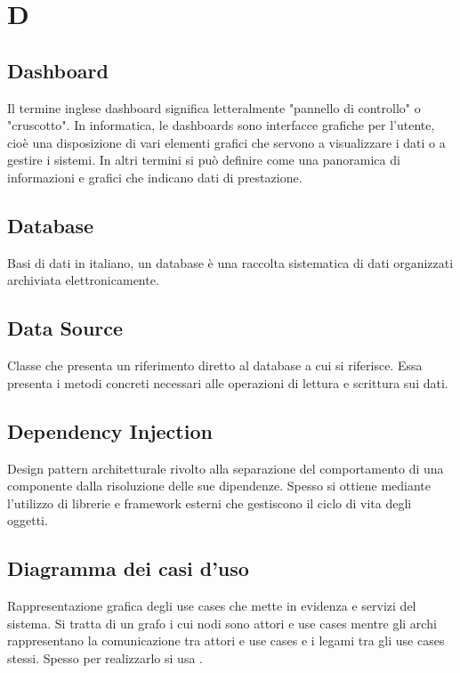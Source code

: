 \chapter{D}


\section{Dashboard}
Il termine inglese dashboard significa letteralmente "pannello di controllo" o "cruscotto". In informatica, le dashboards sono interfacce grafiche per l'utente, cioè una disposizione di vari elementi grafici che servono a visualizzare i dati o a gestire i sistemi. In altri termini si può definire come una panoramica di informazioni e grafici che indicano dati di prestazione.

\section{Database}\label{sec:Database}
Basi di dati in italiano, un database è una raccolta sistematica di dati organizzati archiviata elettronicamente.

\section{Data Source}\label{sec:Data Source}
Classe che presenta un riferimento diretto al database a cui si riferisce. Essa presenta i metodi concreti necessari alle operazioni di lettura e scrittura sui dati.

\section{Dependency Injection}\label{sec:Dependency Injection}
Design pattern architetturale rivolto alla separazione del comportamento di una componente dalla risoluzione delle sue dipendenze. Spesso si ottiene mediante l'utilizzo di librerie e framework esterni che gestiscono il ciclo di vita degli oggetti.

\section{Diagramma dei casi d'uso}\label{sec:Diagrammi dei casi d'uso}
Rappresentazione grafica degli use cases che mette in evidenza  e servizi del sistema. Si tratta di un grafo i cui nodi sono attori e use cases mentre gli archi rappresentano la comunicazione tra attori e use cases e i legami tra gli use cases stessi. Spesso per realizzarlo si usa .

